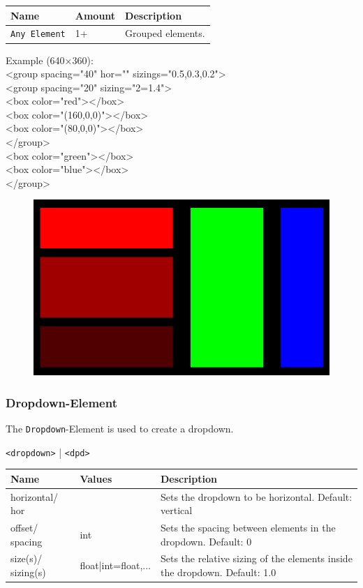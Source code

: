 \documentclass[a4paper,11pt]{article}
\begin{document}
\renewcommand{\arraystretch}{1.3}
\begin{tcolorbox}[colback=white, colframe=black!75, title=Children]
\begin{tabularx}{\linewidth}{p{50pt}|p{110pt}|X}
\textbf{Name} & \textbf{Amount} & \textbf{Description}\\
\hline
\texttt{Any Element} & 1+ & Grouped elements.\\
\end{tabularx}
\end{tcolorbox}

Example (640×360):\\
<group spacing="40" hor="" sizings="0.5,0.3,0.2">\\
<group spacing="20" sizing="2=1.4">\\
<box color="red"></box>\\
<box color="(160,0,0)"></box>\\
<box color="(80,0,0)"></box>\\
</group>\\
<box color="green"></box>\\
<box color="blue"></box>\\
</group>

\begin{figure}[h]
    \centering
    \includegraphics[width=0.5\linewidth]{images/group.png}
\end{figure}



\newpage
\hypertarget{dropdown}{}
\subsubsection*{Dropdown-Element}
The \texttt{Dropdown}-Element is used to create a dropdown.
\begin{center}
    \texttt{<dropdown>} | \texttt{<dpd>}
\end{center}

\renewcommand{\arraystretch}{1.3}
\begin{tcolorbox}[colback=white, colframe=black!75, title=Arguments]
\begin{tabularx}{\linewidth}{p{50pt}|p{110pt}|X}
\textbf{Name} & \textbf{Values} & \textbf{Description}\\
\hline
horizontal/ hor & & Sets the dropdown to be horizontal. Default: vertical\\
\rowcolor[HTML]{E8E8E8}
offset/ spacing & int & Sets the spacing between elements in the dropdown. Default: 0\\
size(s)/ sizing(s) & float|int=float,... & Sets the relative sizing of the elements inside the dropdown. Default: 1.0\\
\end{tabularx}
\end{tcolorbox}
\end{document}
